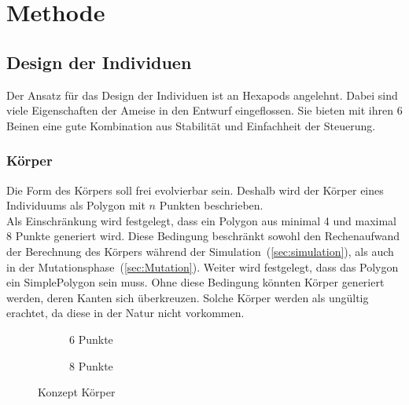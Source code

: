%
%


\chapter{Methode\label{sec:method}}

  \section{Design der Individuen}

    Der Ansatz für das Design der Individuen ist an \Glspl{Hexapod} angelehnt.
    Dabei sind viele Eigenschaften der Ameise in den Entwurf eingeflossen.
    Sie bieten mit ihren 6 Beinen eine gute Kombination aus Stabilität und Einfachheit der Steuerung.

    \subsection{Körper\label{sub:DesignBody}}

      Die Form des Körpers soll frei evolvierbar sein.
      Deshalb wird der Körper eines Individuums als Polygon mit \(n\) Punkten beschrieben.
      \\
      Als Einschränkung wird festgelegt, dass ein Polygon aus minimal 4 und maximal 8 Punkte generiert wird.
      Diese Bedingung beschränkt sowohl den Rechenaufwand der Berechnung des Körpers während der Simulation~(\vref{sec:simulation}),
      als auch in der Mutationsphase~(\vref{sec:Mutation}).
      Weiter wird festgelegt, dass das Polygon ein \gls{SimplePolygon} sein muss.
      Ohne diese Bedingung könnten Körper generiert werden, deren Kanten sich überkreuzen.
      Solche Körper werden als ungültig erachtet, da diese in der Natur nicht vorkommen.

      \begin{figure}[H]
        \centering
        \begin{subfigure}[b]{0.3\textwidth}
          
          \caption{6 Punkte\label{fig:ConceptBodyPoints6}}
        \end{subfigure}
        \qquad
        \begin{subfigure}[b]{0.3\textwidth}
          
          \caption{8 Punkte\label{fig:ConceptBodyPoints8}}
        \end{subfigure}
        \caption{Konzept Körper\label{fig:ConceptBodyPoints}}
      \end{figure}

